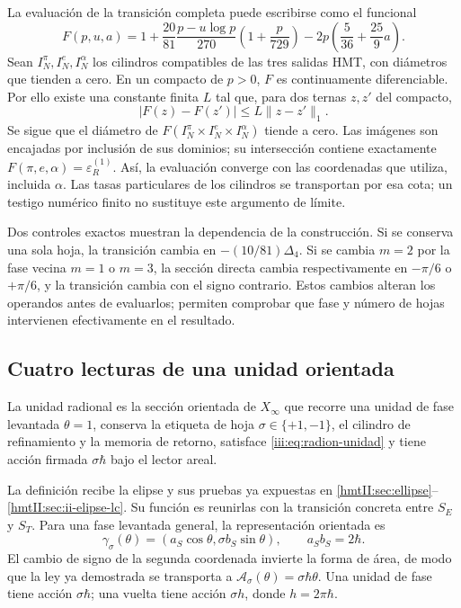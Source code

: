 La evaluación de la transición completa puede escribirse como el funcional
\begin{equation}
 F(p,u,a)=1+\frac{20}{81}\frac{p-u\log p}{270}
                     \left(1+\frac{p}{729}\right)
           -2p\left(\frac5{36}+\frac{25}{9}a\right).
 \label{iii:eq:radion-funcional}
\end{equation}
Sean $I_N^\pi,I_N^e,I_N^\alpha$ los cilindros compatibles de las tres
salidas HMT, con diámetros que tienden a cero. En un compacto de $p>0$,
$F$ es continuamente diferenciable. Por ello existe una constante finita
$L$ tal que, para dos ternas $z,z'$ del compacto,
\[
 |F(z)-F(z')|\leq L\|z-z'\|_1.
\]
Se sigue que el diámetro de
$F(I_N^\pi\times I_N^e\times I_N^\alpha)$ tiende a cero. Las imágenes
son encajadas por inclusión de sus dominios; su intersección contiene
exactamente $F(\pi,e,\alpha)=\varepsilon_R^{(1)}$.
Así, la evaluación converge con las coordenadas que utiliza, incluida
$\alpha$. Las tasas particulares de los cilindros se transportan por esa
cota; un testigo numérico finito no sustituye este argumento de límite.

Dos controles exactos muestran la dependencia de la construcción. Si se
conserva una sola hoja, la transición cambia en $-(10/81)\Delta_4$.
Si se cambia $m=2$ por la fase vecina $m=1$ o $m=3$, la sección directa
cambia respectivamente en $-\pi/6$ o $+\pi/6$, y la transición cambia
con el signo contrario. Estos cambios alteran los operandos antes de
evaluarlos; permiten comprobar que fase y número de hojas intervienen
efectivamente en el resultado.

\subsection{Cuatro lecturas de una unidad orientada}
\label{iii:subsec:radion-cuatro}

\begin{definition}
La unidad radional es la sección orientada de $X_\infty$ que recorre una
unidad de fase levantada $\theta=1$, conserva la etiqueta de hoja
$\sigma\in\{+1,-1\}$, el cilindro de refinamiento y la memoria de
retorno, satisface \eqref{iii:eq:radion-unidad} y tiene acción firmada
$\sigma\hbar$ bajo el lector areal.
\end{definition}

La definición recibe la elipse y sus pruebas ya expuestas en
\ref{hmtII:sec:ellipse}--\ref{hmtII:sec:ii-elipse-lc}. Su función es
reunirlas con la transición concreta entre $S_E$ y $S_T$. Para una fase
levantada general, la representación orientada es
\[
 \gamma_\sigma(\theta)
  =(a_S\cos\theta,\sigma b_S\sin\theta),\qquad a_Sb_S=2\hbar.
\]
El cambio de signo de la segunda coordenada invierte la forma de área,
de modo que la ley ya demostrada se transporta a
$\mathcal A_\sigma(\theta)=\sigma\hbar\theta$.
Una unidad de fase tiene acción $\sigma\hbar$; una vuelta tiene acción
$\sigma h$, donde $h=2\pi\hbar$.


